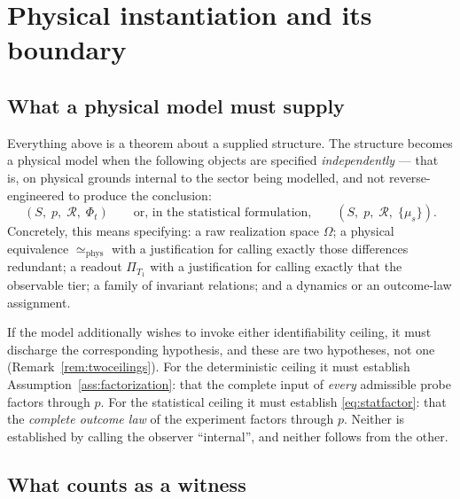 \documentclass[11pt,reqno]{amsart}
\theoremstyle{plain}
\theoremstyle{definition}
\theoremstyle{remark}
\begin{document}
\section{Physical instantiation and its boundary}\label{sec:physical}

\subsection{What a physical model must supply}

Everything above is a theorem about a supplied structure. The structure becomes a physical model when the following objects are specified \emph{independently} --- that is, on physical grounds internal to the sector being modelled, and not reverse-engineered to produce the conclusion:
\[
(S,\;p,\;\mathcal R,\;\Phi_t)
\qquad\text{or, in the statistical formulation,}\qquad
(S,\;p,\;\mathcal R,\;\{\mu_s\}) .
\]
Concretely, this means specifying: a raw realization space $\Omega$; a physical equivalence $\simeq_{\mathrm{phys}}$ with a justification for calling exactly those differences redundant; a readout $\Pi_{T_1}$ with a justification for calling exactly that the observable tier; a family of invariant relations; and a dynamics or an outcome-law assignment.

If the model additionally wishes to invoke either identifiability ceiling, it must discharge the corresponding hypothesis, and these are two hypotheses, not one (Remark~\ref{rem:twoceilings}). For the deterministic ceiling it must establish Assumption~\ref{ass:factorization}: that the complete input of \emph{every} admissible probe factors through $p$. For the statistical ceiling it must establish \eqref{eq:statfactor}: that the \emph{complete outcome law} of the experiment factors through $p$. Neither is established by calling the observer ``internal'', and neither follows from the other.

\subsection{What counts as a witness}
\end{document}
